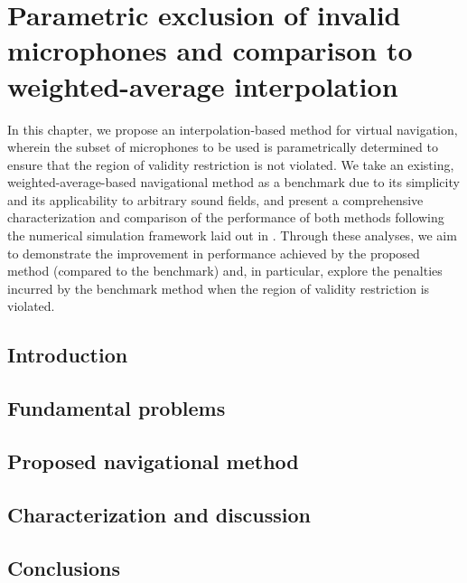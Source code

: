 \chapter{Parametric exclusion of invalid microphones and comparison to weighted-average interpolation}\label{chap:08_Proposed_Method}
In this chapter, we propose an interpolation-based method for virtual navigation, wherein the subset of microphones to be used is parametrically determined to ensure that the region of validity restriction is not violated.
We take an existing, weighted-average-based navigational method as a benchmark due to its simplicity and its applicability to arbitrary sound fields, and present a comprehensive characterization and comparison of the performance of both methods following the numerical simulation framework laid out in .
Through these analyses, we aim to demonstrate the improvement in performance achieved by the proposed method (compared to the benchmark) and, in particular, explore the penalties incurred by the benchmark method when the region of validity restriction is violated.

\section{Introduction}\label{sec:08_Proposed_Method:Introduction}


\section{Fundamental problems}\label{sec:08_Proposed_Method:Fundamental_Problems}


\section{Proposed navigational method}\label{sec:08_Proposed_Method:Proposed_Techniques}


\section{Characterization and discussion}\label{sec:08_Proposed_Method:Results}


\section{Conclusions}\label{sec:08_Proposed_Method:Conclusions}


